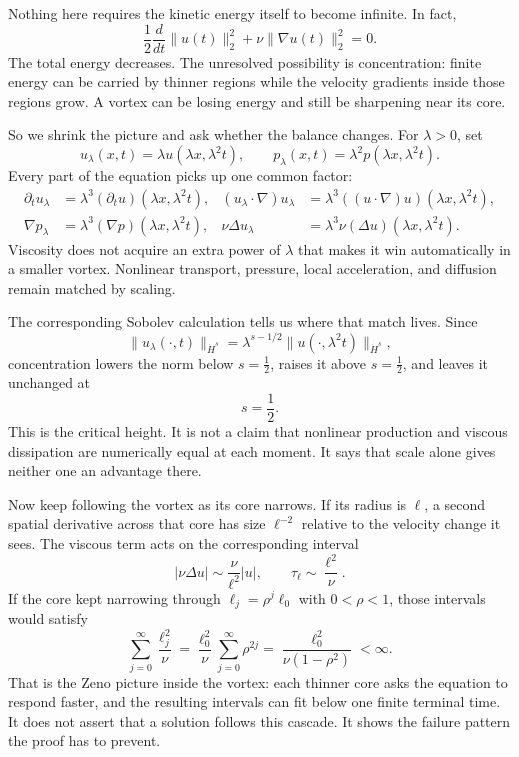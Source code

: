 Nothing here requires the kinetic energy itself to become infinite.  In fact,
\[
\frac12\frac{d}{dt}\|u(t)\|_2^2
+\nu\|\nabla u(t)\|_2^2=0.
\]
The total energy decreases.  The unresolved possibility is concentration:
finite energy can be carried by thinner regions while the velocity gradients
inside those regions grow.  A vortex can be losing energy and still be
sharpening near its core.

So we shrink the picture and ask whether the balance changes.  For
\(\lambda>0\), set
\[
u_\lambda(x,t)=\lambda u(\lambda x,\lambda^2t),
\qquad
p_\lambda(x,t)=\lambda^2p(\lambda x,\lambda^2t).
\]
Every part of the equation picks up one common factor:
\[
\begin{aligned}
\partial_tu_\lambda
  &=\lambda^3(\partial_tu)(\lambda x,\lambda^2t),
&
(u_\lambda\!\cdot\nabla)u_\lambda
  &=\lambda^3((u\!\cdot\nabla)u)(\lambda x,\lambda^2t),\\
\nabla p_\lambda
  &=\lambda^3(\nabla p)(\lambda x,\lambda^2t),
&
\nu\Delta u_\lambda
  &=\lambda^3\nu(\Delta u)(\lambda x,\lambda^2t).
\end{aligned}
\]
Viscosity does not acquire an extra power of \(\lambda\) that makes it win
automatically in a smaller vortex.  Nonlinear transport, pressure, local
acceleration, and diffusion remain matched by scaling.

The corresponding Sobolev calculation tells us where that match lives.  Since
\[
\|u_\lambda(\cdot,t)\|_{\dot H^s}
=\lambda^{s-1/2}\|u(\cdot,\lambda^2t)\|_{\dot H^s},
\]
concentration lowers the norm below \(s=\tfrac12\), raises it above
\(s=\tfrac12\), and leaves it unchanged at
\[
s=\frac12.
\]
This is the critical height.  It is not a claim that nonlinear production and
viscous dissipation are numerically equal at each moment.  It says that scale
alone gives neither one an advantage there.

Now keep following the vortex as its core narrows.  If its radius is
\(\ell\), a second spatial derivative across that core has size
\(\ell^{-2}\) relative to the velocity change it sees.  The viscous term acts
on the corresponding interval
\[
|\nu\Delta u|
\sim\frac{\nu}{\ell^2}|u|,
\qquad
\tau_\ell\sim\frac{\ell^2}{\nu}.
\]
If the core kept narrowing through
\(\ell_j=\rho^j\ell_0\) with \(0<\rho<1\), those intervals would satisfy
\[
\sum_{j=0}^{\infty}\frac{\ell_j^2}{\nu}
=\frac{\ell_0^2}{\nu}\sum_{j=0}^{\infty}\rho^{2j}
=\frac{\ell_0^2}{\nu(1-\rho^2)}<\infty.
\]
That is the Zeno picture inside the vortex: each thinner core asks the equation
to respond faster, and the resulting intervals can fit below one finite
terminal time.  It does not assert that a solution follows this cascade.  It
shows the failure pattern the proof has to prevent.

